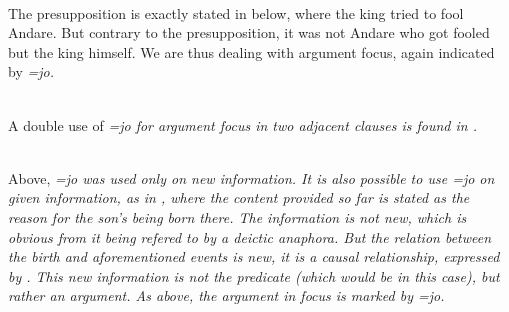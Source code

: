 \\

The presupposition is exactly stated in  below, where the king tried to fool Andare. But contrary to the presupposition, it was not Andare who got fooled but the king himself. We are thus dealing with argument focus, again indicated by \em =jo\em.

\\  
 
A double use of \em =jo \em for argument focus in two adjacent clauses is found in .

 \\

% 



Above, \em =jo \em was used only on new information. It is also possible to use \em =jo \em on given information, as in , where the content provided so far is stated as the reason for the son's being born there. The information is not new, which is obvious from it being refered to by a deictic anaphora. But the relation between the birth and aforementioned events is new, it is a causal relationship, expressed by . This new information is not the predicate (which would be  in this case), but rather an argument. As above, the argument in focus is marked by \em =jo\em.

